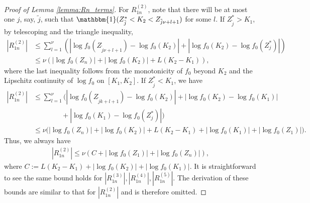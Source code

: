 \documentclass[12pt,letterpaper, twoside, openany]{article}
\theoremstyle{plain}
\begin{document}
\begin{proof}[Proof of Lemma \ref{lemma:Rn_terms}]
		
For $R^{(2)}_{1n}$, note that there will be at most one $j$, say, $\tilde{j}$, such that $\mathbbm{1}( Z^*_{\tilde{j}} < K_2 < Z_{\tilde{j}\nu+l+1})$ for some $l$. If $Z^*_{\tilde{j}} > K_1$, by telescoping and the triangle inequality,
\begin{align*}
    |R^{(2)}_{1n}|	 & \leq \sum^\nu_{l=1}\left( |\log f_0(Z_{\tilde{j} \nu+l+1}) - \log f_0(K_2)| + |\log f_0(K_2) - \log f_0(Z^*_j)|\right)\\
    &\leq \nu (|\log f_0(Z_n)| + |\log f_0(K_2)| + L(K_2 - K_1)),
\end{align*}
		where the last inequality follows from the monotonicity of $f_0$ beyond $K_2$ and the Lipschitz continuity of $\log f_0$ on $[K_1, K_2]$. 
		If $Z^*_{\tilde{j}} < K_1$, we have
		\begin{align*}
			|R^{(2)}_{1n}|	 & \leq \sum^\nu_{l=1}\bigg(  |\log f_0(Z_{\tilde{j} k+l+1}) - \log f_0(K_2)| + |\log f_0(K_2) - \log f_0(K_1)|\\
			& \quad  \quad  \quad  \quad + |\log f_0(K_1) - \log f_0(Z^*_j)|\bigg)\\
			&\leq \nu\bigg(|\log f_0(Z_n)| + |\log f_0(K_2)| + L(K_2-K_1) +  |\log f_0(K_1)| +  |\log f_0(Z_1)|\bigg).
		\end{align*}
		Thus, we always have
		\begin{align*}
			|R^{(2)}_{1n}| \leq \nu (C + |\log f_0(Z_1)|+|\log f_0(Z_n)|),
		\end{align*}
		where $C := L(K_2-K_1) + |\log f_0(K_2)| + |\log f_0(K_1)|$. It is straightforward to see the same bound holds for $|R^{(3)}_{1n}|, |R^{(4)}_{1n}|, |R^{(5)}_{1n}|$. The derivation of these bounds are similar to that for $|R^{(2)}_{1n}|$ and is therefore omitted.
		

\end{proof}
\end{document}
